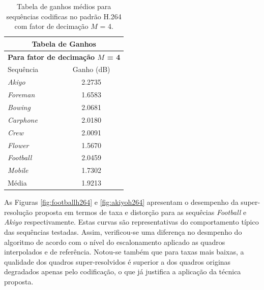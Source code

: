 \begin{table}[hbt]
\centering
\caption{Tabela de ganhos médios para sequências codificas no padrão H.264 com fator de decimação $M$ = 4.}	
\label{GanhoH2644}
\begin{tabular}{l|c}
\hline
\multicolumn{2}{c}{\textbf{Tabela de Ganhos}}\\
\hline
\hline
\multicolumn{2}{c}{\textbf{Para fator de decimação $M$ = 4}}\\
\hline
\hline			
Sequência	    & Ganho (dB)\\
\hline
\hline
\textit{Akiyo}		&2.2735\\
\hline
\textit{Foreman}		&1.6583 \\
\hline
\textit{Bowing}		&2.0681\\
\hline
\textit{Carphone}	& 2.0180\\
\hline
\textit{Crew}		& 2.0091\\
\hline
\textit{Flower}		&1.5670\\
\hline
\textit{Football}	&2.0459\\
\hline
\textit{Mobile}	&1.7302\\
\hline
\hline
Média	&1.9213\\
\hline
\end{tabular}
\end{table}

As Figuras \ref{fig:footballh264} e \ref{fig:akiyoh264} apresentam o desempenho da super-resolução proposta em termos de taxa e distorção para as sequêcias \textit{Football} e \textit{Akiyo} respectivamente. Estas curvas são representativas do comportamento típico das sequências testadas. Assim, verificou-se uma diferença no desmpenho do algoritmo de acordo com o nível do escalonamento aplicado as quadros interpolados e de referência. Notou-se também que para taxas mais baixas, a qualidade dos quadros super-resolvidos é superior a dos quadros originas degradados apenas pelo codificação, o que já justifica a aplicação da técnica proposta.



